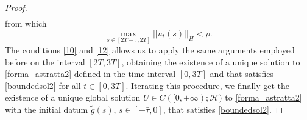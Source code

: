 \documentclass[10pt,a4paper]{amsart}
\begin{document}
\begin{proof}
$$\begin{array}{l}
\end{array}$$
from which 
\begin{equation}\label{12}
	\max_{s\in [2T-\bar{\tau},2T]}||u_t(s)||_H<\rho.
\end{equation}
The conditions \eqref{10} and \eqref{12} allows us to apply the same arguments employed before on the interval $[2T,3T]$, obtaining the existence of a unique solution to \eqref{forma_astratta2} defined in the time interval $[0,3T]$ and that satisfies \eqref{boundedsol2} for all $t\in [0,3T]$. Iterating this procedure, we finally get the existence of a unique global solution $U\in C([0,+\infty);\mathcal{H})$ to \eqref{forma_astratta2} with the initial datum $\tilde{g}(s)$, $s\in [-\bar{\tau},0]$, that satisfies \eqref{boundedsol2}.
\end{proof}	
\end{document}
